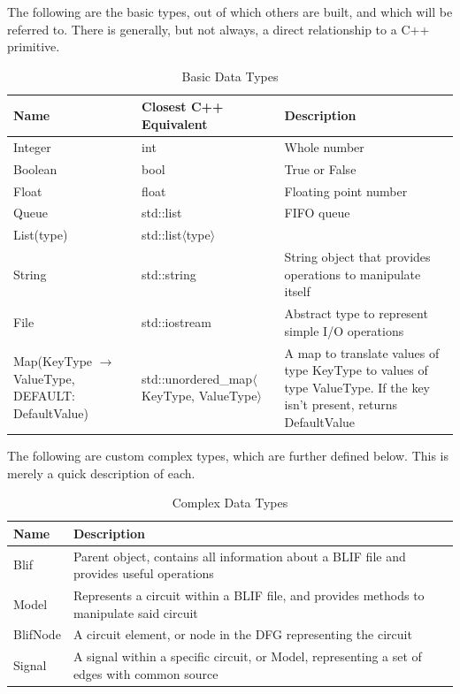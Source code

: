 \documentclass[12pt,final,oneside]{dwThesis} %
\begin{document}
   The following are the basic types, out of which others are built, and which
   will be referred to. There is generally, but not always, a direct
   relationship to a C++ primitive.  
   \begin{table}


      \begin{tabularx}
         {\linewidth}{XXX} \toprule Name & Closest C++ Equivalent
         & Description\\
         \midrule Integer &  int & Whole number \\
         Boolean &
         bool & True or False \\
         Float & float & Floating point number \\
         Queue
         & std::list & FIFO queue \\
         List(type) &
         std::list$\langle$type$\rangle$ & \\
         String & std::string & String
         object that provides operations to manipulate itself \\
         File &
         std::iostream & Abstract type to represent simple I/O operations \\

         Map(KeyType $\to$ ValueType, DEFAULT:  DefaultValue) &
         std::unordered\_map$\langle$KeyType, ValueType$\rangle$ &  A map to
         translate values of type KeyType to values of type ValueType. If the
         key isn't present, returns DefaultValue \\
         \bottomrule 
      \end{tabularx}

      \caption{Basic Data Types} 
   \end{table}
   The following are custom complex
   types, which are further defined below. This is merely a quick description
   of each.  
   \begin{table}

      \begin{tabularx}
         {\linewidth}{lX} \toprule Name &
         Description\\
         \midrule Blif & Parent object, contains all information
         about a \gls{BLIF} file and provides useful operations \\
         Model &
         Represents a circuit within a \gls{BLIF} file, and provides methods to
         manipulate said circuit \\
         BlifNode & A circuit element, or node in
         the \gls{DFG} representing the circuit \\
         Signal & A signal within a
         specific circuit, or Model, representing a set of edges with common
         source \\
         \bottomrule 
      \end{tabularx}
      \caption{Complex Data Types}

   \end{table}
\end{document}
